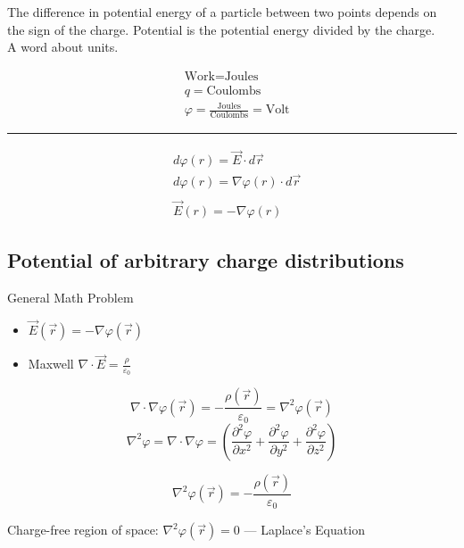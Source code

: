 \documentclass[svgnames]{article}   	%
\begin{document}
The difference in potential energy of a particle between two points depends on
the sign of the charge. Potential is the potential energy divided by the
charge. \\


A word about units. 

\begin{align*}
  &\text{Work} = \text{Joules} \\
  &q = \text{Coulombs} \\
  &\varphi = \frac{\text{Joules}}{\text{Coulombs}} = \text{Volt}
\end{align*}
\hrule
\vspace{10px} 

\begin{align*}
  &d\varphi(r) = \vec{E} \cdot d\vec{r} \\
  &d\varphi(r) = \nabla \varphi(r) \cdot d\vec{r} \\\\
  &\vec{E}(r) = -\nabla\varphi(r)
\end{align*}

\subsection{Potential of arbitrary charge distributions}

General Math Problem 

\begin{itemize}
  \item $\vec{E}(\vec{r}) = -\nabla \varphi(\vec{r})$
  \item Maxwell  $\nabla \cdot \vec{E} = \frac{\rho}{\varepsilon_0}$
\end{itemize}

\[
  \nabla \cdot \nabla \varphi(\vec{r}) = -\frac{\rho(\vec{r})}{\varepsilon_0}
  = \nabla^2 \varphi(\vec{r})
\]
\[
  \nabla^2 \varphi = \nabla \cdot \nabla \varphi = \left( \frac{\partial^2 \varphi}{\partial
    x^2} + \frac{\partial^2 \varphi}{\partial y^2} + \frac{\partial^2
    \varphi}{\partial z^2} \right) 
\]

\begin{tcolorbox}[title = Poisson's Equation]

  \[
    \nabla^2 \varphi(\vec{r}) = -\frac{\rho(\vec{r})}{\varepsilon_0}
  \]

\end{tcolorbox}

Charge-free region of space: $\nabla^2 \varphi(\vec{r}) = 0$ --- Laplace's
Equation
\end{document}
